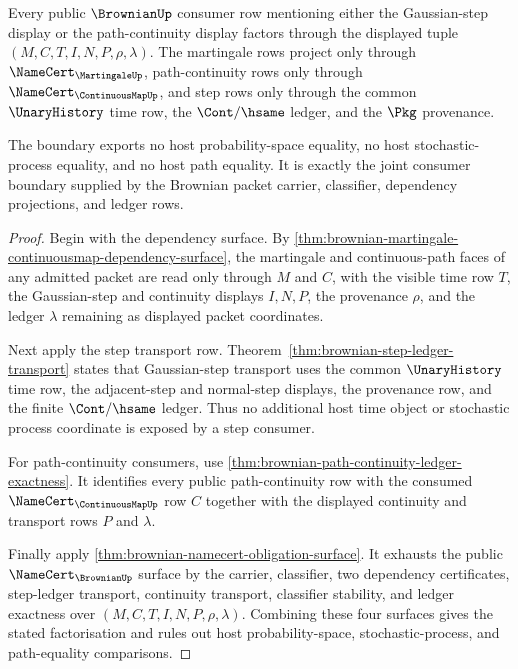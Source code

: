 \begin{theorem}
\label{thm:brownian-path-step-boundary-exhaustion}
Every public $\BrownianUp$ consumer row mentioning either the Gaussian-step
display or the path-continuity display factors through the displayed tuple
$(M,C,T,I,N,P,\rho,\lambda)$. The martingale rows project only through
$\NameCert_{\MartingaleUp}$, path-continuity rows only through
$\NameCert_{\ContinuousMapUp}$, and step rows only through the common
$\UnaryHistory$ time row, the $\Cont/\hsame$ ledger, and the $\Pkg$
provenance.

The boundary exports no host probability-space equality, no host
stochastic-process equality, and no host path equality. It is exactly the
joint consumer boundary supplied by the Brownian packet carrier, classifier,
dependency projections, and ledger rows.
\end{theorem}

\begin{proof}
Begin with the dependency surface. By
\autoref{thm:brownian-martingale-continuousmap-dependency-surface}, the
martingale and continuous-path faces of any admitted packet are read only
through $M$ and $C$, with the visible time row $T$, the Gaussian-step and
continuity displays $I,N,P$, the provenance $\rho$, and the ledger
$\lambda$ remaining as displayed packet coordinates.

Next apply the step transport row. Theorem~\ref{thm:brownian-step-ledger-transport}
states that Gaussian-step transport uses the common $\UnaryHistory$ time row,
the adjacent-step and normal-step displays, the provenance row, and the finite
$\Cont/\hsame$ ledger. Thus no additional host time object or stochastic
process coordinate is exposed by a step consumer.

For path-continuity consumers, use
\autoref{thm:brownian-path-continuity-ledger-exactness}. It identifies every
public path-continuity row with the consumed $\NameCert_{\ContinuousMapUp}$
row $C$ together with the displayed continuity and transport rows $P$ and
$\lambda$.

Finally apply
\autoref{thm:brownian-namecert-obligation-surface}. It exhausts the public
$\NameCert_{\BrownianUp}$ surface by the carrier, classifier, two dependency
certificates, step-ledger transport, continuity transport, classifier
stability, and ledger exactness over $(M,C,T,I,N,P,\rho,\lambda)$. Combining
these four surfaces gives the stated factorisation and rules out host
probability-space, stochastic-process, and path-equality comparisons.
\end{proof}

